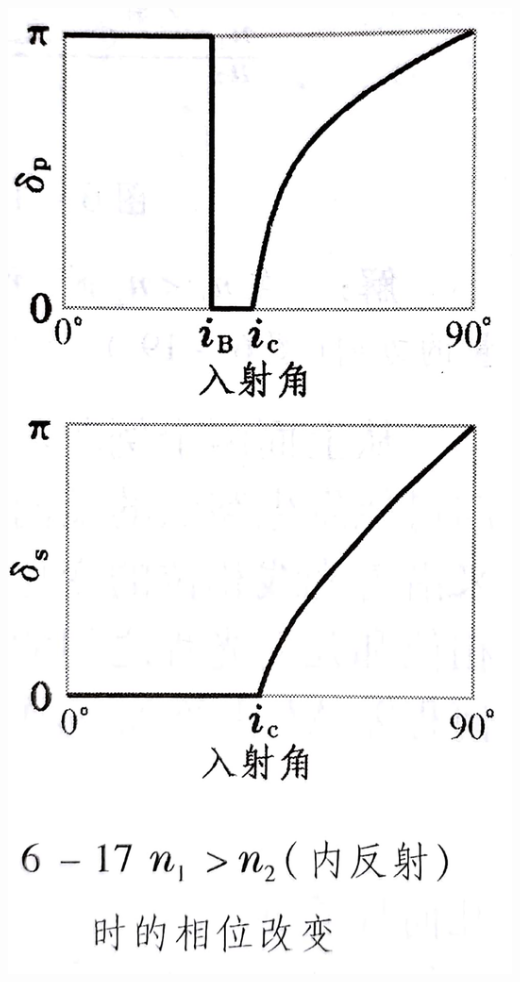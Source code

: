 \documentclass[UTF8,8pt]{ctexart}
\begin{document}
\begin{multicols}{3}
\begin{itemize}
\includegraphics[scale=0.06]{11.jpg}

\end{itemize}
\end{multicols}
\end{document}
